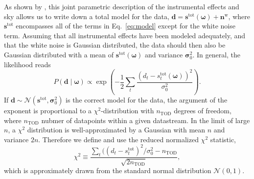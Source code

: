 \documentclass[twocolumn]{../../common/aa}
\begin{document}
As shown by \citet{bp01}, this joint parametric description of the instrumental effects and sky allows us to write down a total model for the data, $\boldsymbol d=\boldsymbol s^\mathrm{tot}(\boldsymbol\omega)+\boldsymbol n^\mathrm w$, where $\boldsymbol s^\mathrm{tot}$ encompasses all of the terms in Eq.~\eqref{eq:model} except for the white noise term. Assuming that all instrumental effects have been modeled adequately, and that the white noise is Gaussian distributed, the data should then also be Gaussian distributed with a mean of $\boldsymbol s^\mathrm{tot}(\boldsymbol\omega)$ and variance $\boldsymbol \sigma_0^2$. In general, the likelihood reads
\begin{equation}
	P(\boldsymbol d\mid\boldsymbol\omega)\propto\exp\left(-\frac12\sum_t\frac{(d_t-s^\mathrm{tot}_t(\boldsymbol\omega))^2}{\sigma_0^2}
	\right).
\end{equation}
If $\boldsymbol d\sim\mathcal N(\boldsymbol s^\mathrm{tot},\boldsymbol\sigma_0^2)$ is the correct model for the data, the argument of the exponent is proportional to a $\chi^2$-distribution with $n_\mathrm{TOD}$ degrees of freedom, where $n_\mathrm{TOD}$ nubmer of datapoints within a given datastream. In the limit of large $n$, a $\chi^2$ distribution is well-approximated by a Gaussian with mean $n$ and variance $2n$. Therefore we define and use the reduced normalized $\chi^2$ statistic,
\begin{equation}
  \chi^2\equiv \frac{\sum_t((d_t-s_t^\mathrm{tot})^2/\sigma_0^2 - n_\mathrm{TOD}}{\sqrt{2n_\mathrm{TOD}}},
  \label{eq:chisq}
\end{equation}
which is approximately drawn from the standard normal distribution $\mathcal N(0,1)$.
\end{document}
